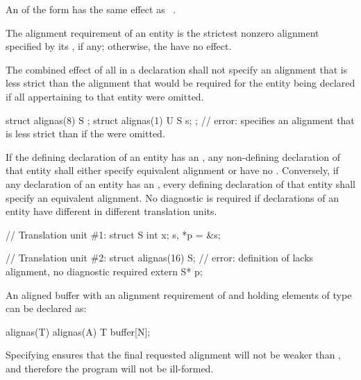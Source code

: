 \pnum
An  of the form
  \tcode{)} has the same
effect as  ~\tcode{))}.

\pnum
The alignment requirement of an entity is the strictest nonzero alignment
specified by its , if any;
otherwise, the  have no effect.

\pnum
The combined effect of all  in a declaration shall not
specify an alignment that is less strict than the alignment that would
be required for the entity being declared if all 
appertaining to that entity
were omitted.
\begin{example}
\begin{codeblock}
struct alignas(8) S {};
struct alignas(1) U {
  S s;
};  // error:  specifies an alignment that is less strict than if the  were omitted.
\end{codeblock}
\end{example}

\pnum
If the defining declaration of an entity has an
, any non-defining
declaration of that entity shall either specify equivalent alignment or have no
.
Conversely, if any declaration of an entity has an
,
every defining
declaration of that entity shall specify an equivalent alignment.
No diagnostic is required if declarations of an entity have
different 
in different translation units.
\begin{example}
\begin{codeblock}
// Translation unit \#1:
struct S { int x; } s, *p = &s;

// Translation unit \#2:
struct alignas(16) S;           // error: definition of  lacks alignment, no diagnostic required
extern S* p;
\end{codeblock}
\end{example}

\pnum
\begin{example}
An aligned buffer with an alignment requirement
of  and holding  elements of type 
can be declared as:
\begin{codeblock}
alignas(T) alignas(A) T buffer[N];
\end{codeblock}
Specifying  ensures
that the final requested alignment will not be weaker than ,
and therefore the program will not be ill-formed.
\end{example}

